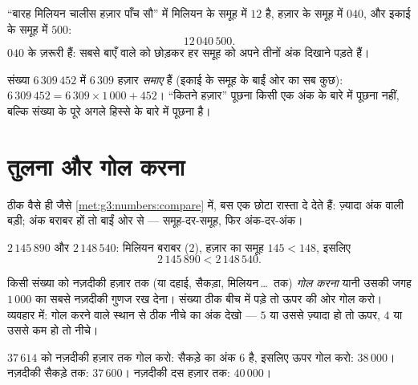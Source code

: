 \begin{example}[अंक-समूहों से लिखना]\label{ex:g4:numbers:write}
``बारह मिलियन चालीस हज़ार पाँच सौ'' में मिलियन के समूह में $12$
है, हज़ार के समूह में $040$, और इकाई के समूह में
$500$:
\[
12\,040\,500 .
\]
$040$ के  ज़रूरी हैं: सबसे बाएँ वाले को छोड़कर हर समूह को
अपने तीनों अंक दिखाने पड़ते हैं।
\end{example}

\begin{example}[कितने हज़ार?]\label{ex:g4:numbers:contained}
संख्या $6\,309\,452$ में $6\,309$ हज़ार \emph{समाए} हैं (इकाई के
समूह के बाईं ओर का सब कुछ): $6\,309\,452 = 6\,309 \times
1\,000 + 452$। ``कितने हज़ार'' पूछना किसी एक अंक के बारे में
पूछना नहीं, बल्कि संख्या के पूरे अगले हिस्से के बारे में पूछना है।
\end{example}

\section{तुलना और गोल करना}

\begin{method}[बड़ी संख्याओं की तुलना]\label{met:g4:numbers:compare}
ठीक वैसे ही जैसे \cref{met:g3:numbers:compare} में, बस 
एक छोटा रास्ता दे देते हैं: ज़्यादा अंक वाली बड़ी; अंक बराबर हों
तो बाईं ओर से --- समूह-दर-समूह, फिर अंक-दर-अंक।
\end{method}

\begin{example}\label{ex:g4:numbers:compare}
$2\,145\,890$ और $2\,148\,540$: मिलियन बराबर ($2$), हज़ार का
समूह $145 < 148$, इसलिए
\[
2\,145\,890 < 2\,148\,540 .
\]
\end{example}

\begin{definition}[गोल करना]\label{def:g4:numbers:round}
किसी संख्या को नज़दीकी हज़ार तक (या दहाई, सैकड़ा,
मिलियन\,\dots\ तक) \emph{गोल करना} यानी उसकी
जगह $1\,000$ का सबसे नज़दीकी गुणज रख देना। संख्या ठीक बीच में
पड़े तो ऊपर की ओर गोल करो। व्यवहार में: गोल करने वाले स्थान से
ठीक नीचे का अंक देखो --- $5$ या उससे ज़्यादा हो तो ऊपर, $4$ या उससे कम हो तो नीचे।
\end{definition}

\begin{example}\label{ex:g4:numbers:round}
$37\,614$ को नज़दीकी हज़ार तक गोल करो: सैकड़े का अंक
$6$ है, इसलिए ऊपर गोल करो: $38\,000$। नज़दीकी सैकड़े तक:
$37\,600$। नज़दीकी दस हज़ार तक: $40\,000$।
\end{example}

